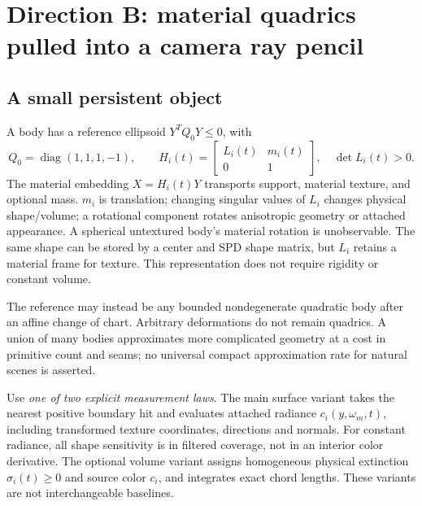 \documentclass[10pt,letterpaper]{article}
\theoremstyle{remark}\newtheorem{counterexample}[proposition]{Counterexample}
\newcommand{\diag}{\operatorname{diag}}
\begin{document}
\section{Direction B: material quadrics pulled into a camera ray pencil}

\subsection{A small persistent object}
A body has a reference ellipsoid $Y^TQ_0Y\leq0$, with
\begin{equation}
 Q_0=\diag(1,1,1,-1),\qquad
 H_i(t)=\begin{bmatrix}L_i(t)&m_i(t)\\0&1\end{bmatrix},\quad\det L_i(t)>0.
 \label{eq:quadric}
\end{equation}
The material embedding $X=H_i(t)Y$ transports support, material texture, and optional mass. $m_i$ is translation; changing singular values of $L_i$ changes physical shape/volume; a rotational component rotates anisotropic geometry or attached appearance. A spherical untextured body's material rotation is unobservable. The same shape can be stored by a center and SPD shape matrix, but $L_i$ retains a material frame for texture. This representation does not require rigidity or constant volume.

The reference may instead be any bounded nondegenerate quadratic body after an affine change of chart. Arbitrary deformations do not remain quadrics. A union of many bodies approximates more complicated geometry at a cost in primitive count and seams; no universal compact approximation rate for natural scenes is asserted.

Use \emph{one of two explicit measurement laws}. The main surface variant takes the nearest positive boundary hit and evaluates attached radiance $c_i(y,\omega_m,t)$, including transformed texture coordinates, directions and normals. For constant radiance, all shape sensitivity is in filtered coverage, not in an interior color derivative. The optional volume variant assigns homogeneous physical extinction $\sigma_i(t)\geq0$ and source color $c_i$, and integrates exact chord lengths. These variants are not interchangeable baselines.
\end{document}
